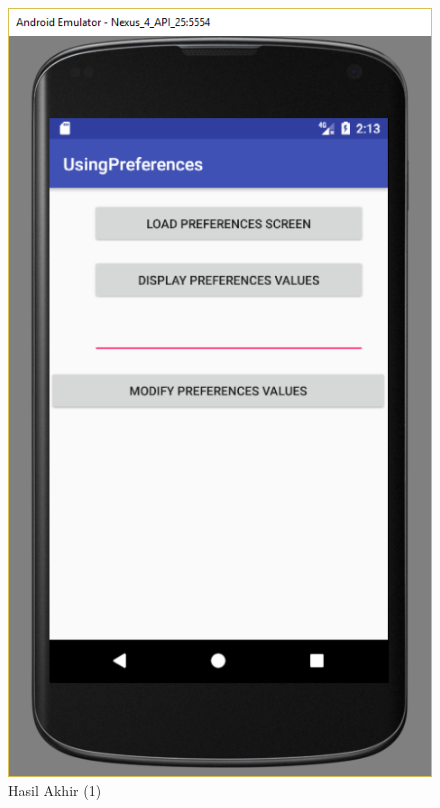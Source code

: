 \documentclass{scrartcl}
\begin{document}
\begin{enumerate}
			\begin{figure}[htbp]
			\begin{minipage}{.5\textwidth}
				\centering
				\includegraphics[width=0.7\linewidth]{screenshot001}
				\caption{Hasil Akhir (1)}
				\label{fig:screenshot001}
			\end{minipage}
			\begin{minipage}{.5\textwidth}
				\centering

\end{minipage}
\end{figure}
\end{enumerate}
\end{document}
